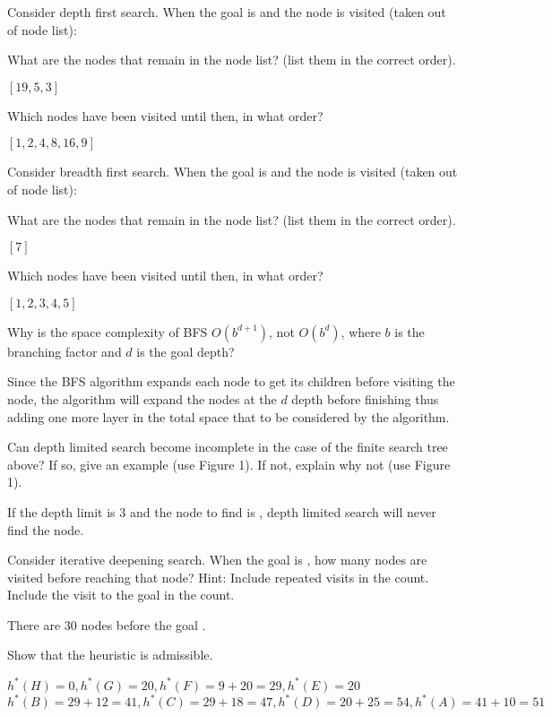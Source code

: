 \documentclass[12pt]{article}
\begin{document}
\thispagestyle{empty}

\problem Consider depth first search. When the goal is  and the node is visited
(taken out of node list):

\subproblem What are the nodes that remain in the node list? (list them in the correct order).

\solution
$[19,5,3]$

\subproblem Which nodes have been visited until then, in what order?

\solution
$[1,2,4,8,16,9]$

\problem Consider breadth first search. When the goal is  and the node is visited
(taken out of node list):

\subproblem What are the nodes that remain in the node list? (list them in the correct order).

\solution
$[7]$

\subproblem Which nodes have been visited until then, in what order?

\solution
$[1,2,3,4,5]$

\problem Why is the space complexity of BFS $O\left(b^{d+1}\right)$, not $O\left(b^d\right)$, where $b$ is the branching factor and $d$ is the goal depth?

\solution
Since the BFS algorithm expands each node to get its children before visiting the node, the algorithm will expand the nodes at the $d$ depth before finishing thus adding one more layer in the total space that to be considered by the algorithm.

\problem Can depth limited search become incomplete in the case of the finite search
tree above? If so, give an example (use Figure 1). If not, explain why not (use Figure 1).

\solution
If the depth limit is $3$ and the node to find is , depth limited search will never find the node.

\clearpage
\problem Consider iterative deepening search. When the goal is  , how many nodes are visited before reaching that node? Hint: Include repeated visits in the count. Include the visit to the goal  in the count.

\solution
There are 30 nodes before the goal .

\problem Show that the heuristic is admissible.

\solution
$h^*(H)=0,h^*(G)=20,h^*(F)=9+20=29,h^*(E)=20$\\
$h^*(B)=29+12=41,h^*(C)=29+18=47,h^*(D)=20+25=54,h^*(A)=41+10=51$
\end{document}
